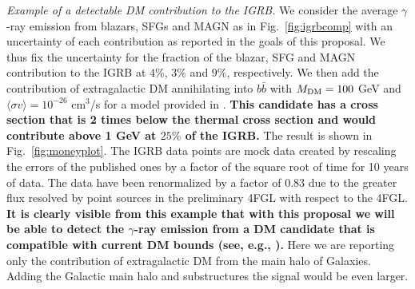 \documentclass[12 pt]{article}
\begin{document}
{\it Example of a detectable DM contribution to the IGRB.}
We consider the average $\gamma$-ray emission from blazars, SFGs and MAGN as in Fig.~\ref{fig:igrbcomp} with an uncertainty of each contribution as reported in the goals of this proposal. We thus fix the uncertainty for the fraction of the blazar, SFG and MAGN contribution to the IGRB at $4\%$, $3\%$ and $9\%$, respectively.
We then add the contribution of extragalactic DM annihilating into $b\bar{b}$ with $M_{\rm{DM}}=100$ GeV and $\langle \sigma v \rangle = 10^{-26}$ cm$^3$/s for a model provided in \cite{Cirelli:2010xx}. 
{\bf This candidate has a cross section that is 2 times below the thermal cross section and would contribute above 1 GeV at $25\%$ of the IGRB.}
The result is shown in Fig.~\ref{fig:moneyplot}. The IGRB data points are mock data created by rescaling the errors of the published ones \cite{Ackermann:2014usa} by a factor of the square root of time for 10 years of data. The data have been renormalized by a factor of 0.83 due to the greater flux resolved by point sources in the preliminary 4FGL with respect to the 4FGL.
{\bf It is clearly visible from this example that with this proposal we will be able to detect the $\gamma$-ray emission from a DM candidate that is compatible with current DM bounds (see, e.g., \cite{Fermi-LAT:2016uux}).} Here we are reporting only the contribution of extragalactic DM from the main halo of Galaxies. Adding the Galactic main halo and substructures the signal would be even larger.



\end{document}
